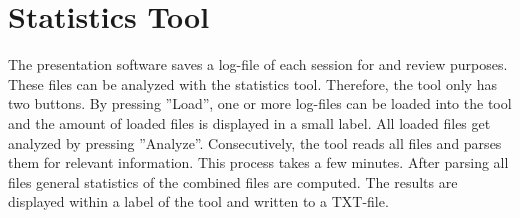 %


\section{Statistics Tool}
\label{implementation_tool}
 
The presentation software saves a log-file of each session for and review purposes. These files can be analyzed with the statistics tool. Therefore, the tool only has two buttons. By pressing ''Load'', one or more log-files can be loaded into the tool and the amount of loaded files is displayed in a small label. All loaded files get analyzed by pressing ''Analyze''. Consecutively, the tool reads all files and parses them for relevant information. This process takes a few minutes. After parsing all files general statistics of the combined files are computed. The results are displayed within a label of the tool and written to a TXT-file.

